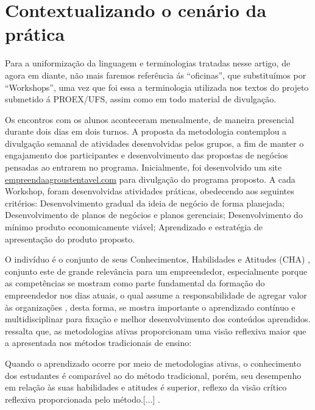 \section{Contextualizando o cenário da prática}


Para a uniformização da linguagem e terminologias tratadas nesse artigo, de agora em diante, não mais faremos referência ás “oficinas”, que substituímos por “Workshops”, uma vez que foi essa a terminologia utilizada nos textos do projeto submetido á PROEX/UFS, assim como em todo material de divulgação. 

Os encontros com os alunos aconteceram mensalmente, de maneira presencial durante dois dias em dois turnos. A proposta da metodologia contemplou a divulgação semanal de atividades desenvolvidas pelos grupos, a fim de manter o engajamento dos participantes e desenvolvimento das propostas de negócios pensadas ao entrarem no programa. Inicialmente, foi desenvolvido um site \href{http://www.empreendaagrosustentavel.com}{empreendaagroustentavel.com}  para divulgação do programa proposto. A cada Workshop, foram desenvolvidas atividades práticas, obedecendo aos seguintes critérios: Desenvolvimento gradual da ideia de negócio de forma planejada; Desenvolvimento de planos de negócios e planos gerenciais; Desenvolvimento do mínimo produto economicamente viável; Aprendizado e estratégia de apresentação do produto proposto.
 

O indivíduo é o conjunto de seus Conhecimentos, Habilidades e Atitudes (CHA) \cite{dutra_competencias_2004}, conjunto este de grande relevância para um empreendedor, especialmente porque as competências se mostram como parte fundamental da formação do empreendedor nos dias atuais, o qual assume a responsabilidade de agregar valor às organizações \cite{ferreira_conhecimento_2019}, desta forma, se mostra importante o aprendizado contínuo e multidisciplinar para fixação e melhor desenvolvimento dos conteúdos aprendidos.  ressalta que, as metodologias ativas proporcionam uma visão reflexiva maior que a apresentada nos métodos tradicionais de ensino: 

\begin{citacao}
[...] Quando o aprendizado ocorre por meio de metodologias ativas, o conhecimento dos estudantes é comparável ao do método tradicional, porém, seu desempenho em relação às suas habilidades e atitudes é superior, reflexo da visão crítico reflexiva proporcionada pelo método.[...] \cite{limberger_metodologias_2013}.
\end{citacao}


